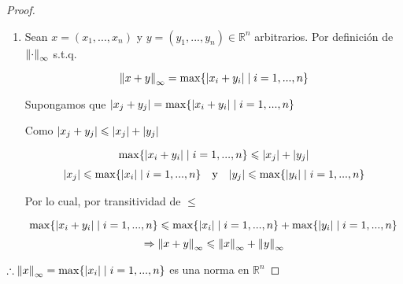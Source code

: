 \documentclass[12pt]{article}
\newcommand{\subscript}[2]{$#1 _ #2$}
\newcommand\R{\ensuremath{\mathbb{R}}}
\begin{document}
\begin{enumerate}[label=\textbf{\arabic*}.]
\begin{proof}
\begin{enumerate}[label=(\subscript{N}{{\arabic*}})]
\begin{enumerate}
\end{enumerate}

\item Sean $x=(x_1,...,x_n)$ y $y=(y_1,...,y_n) \in \R^n$ arbitrarios. Por definición de ${\norm{ \cdot}}_{\infty}$ s.t.q.

\begin{equation*}
    {\norm{ x+y}}_{\infty} = \max \{ \abs{{x}_{i}+{y}_{i}} \mid i = 1,...,n\}
\end{equation*}

Supongamos que $\abs{x_j + y_j} = \max \{ \abs{{x}_{i}+{y}_{i}} \mid i = 1,...,n\}$

Como $\abs{x_j + y_j} \leqslant \abs{x_j} + \abs{y_j}$

\begin{equation*}
    \max \{ \abs{{x}_{i}+{y}_{i}} \mid i = 1,...,n\} \leqslant \abs{x_j} + \abs{y_j}
\end{equation*}
\begin{align*}
        \abs{x_j} \leqslant \max \{ \abs{{x}_{i}} \mid i = 1,...,n\} & & \text{y} & & \abs{y_j} \leqslant \max \{ \abs{{y}_{i}} \mid i = 1,...,n\}
\end{align*}

Por lo cual, por transitividad de $\leqslant$

\begin{equation*}
    \max \{ \abs{{x}_{i}+{y}_{i}} \mid i = 1,...,n\} \leqslant \max \{ \abs{{x}_{i}} \mid i = 1,...,n\} + \max \{ \abs{{y}_{i}} \mid i = 1,...,n\} 
\end{equation*}
\begin{equation*}
    \Rightarrow {\norm{ x+y}}_{\infty} \leqslant  {\norm{x}}_{\infty} +  {\norm{y}}_{\infty}
\end{equation*}
\end{enumerate}    
$\therefore {\norm{x}}_{\infty} = \max \{ \abs{{x}_{i}} \mid i = 1,...,n\}$ es una norma en $\R^n$
\end{proof}


\end{enumerate}
\end{document}
